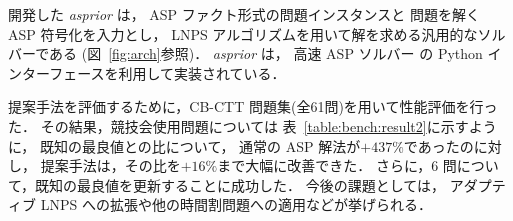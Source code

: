 開発した \textit{asprior} は，
ASP ファクト形式の問題インスタンスと
問題を解く ASP 符号化を入力とし，
LNPS アルゴリズムを用いて解を求める汎用的なソルバーである
(図~\ref{fig:arch}参照)．
\textit{asprior} は，
高速 ASP ソルバー {\clingo}%
の Python インターフェースを利用して実装されている．

提案手法を評価するために，CB-CTT 問題集(全61問)を用いて性能評価を行った．
その結果，競技会使用問題については
表~\ref{table:bench:result2}に示すように，
既知の最良値との比について，
通常の ASP 解法が$+437\%$であったのに対し，
提案手法は，その比を$+16\%$まで大幅に改善できた．
%
さらに，6 問について，既知の最良値を更新することに成功した．
今後の課題としては，
アダプティブ LNPS への拡張や他の時間割問題への適用などが挙げられる．


